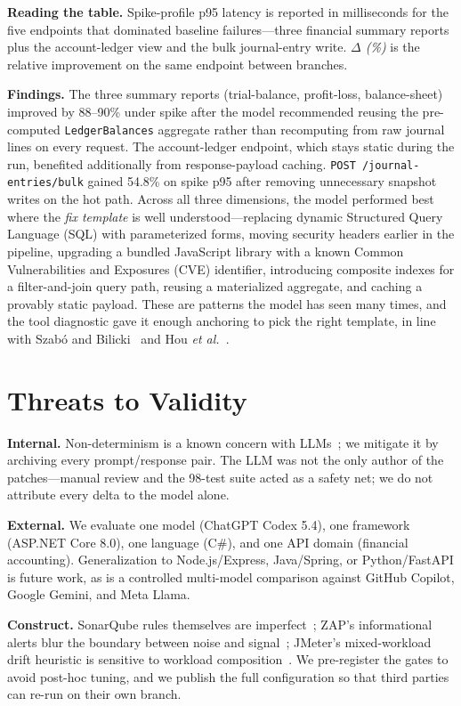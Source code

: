 \documentclass[conference,letterpaper]{IEEEtran}
\begin{document}
\textbf{Reading the table.} Spike-profile p95 latency is reported in milliseconds for the five endpoints that dominated baseline failures---three financial summary reports plus the account-ledger view and the bulk journal-entry write. \emph{$\Delta$ (\%)} is the relative improvement on the same endpoint between branches.

\textbf{Findings.} The three summary reports (trial-balance, profit-loss, balance-sheet) improved by 88--90\% under spike after the model recommended reusing the pre-computed \texttt{LedgerBalances} aggregate rather than recomputing from raw journal lines on every request. The account-ledger endpoint, which stays static during the run, benefited additionally from response-payload caching. \texttt{POST /journal-entries/bulk} gained 54.8\% on spike p95 after removing unnecessary snapshot writes on the hot path. Across all three dimensions, the model performed best where the \emph{fix template} is well understood---replacing dynamic Structured Query Language (SQL) with parameterized forms, moving security headers earlier in the pipeline, upgrading a bundled JavaScript library with a known Common Vulnerabilities and Exposures (CVE) identifier, introducing composite indexes for a filter-and-join query path, reusing a materialized aggregate, and caching a provably static payload. These are patterns the model has seen many times, and the tool diagnostic gave it enough anchoring to pick the right template, in line with Szab\'o and Bilicki~\cite{ref7} and Hou \textit{et al.}~\cite{ref14}.

\section{Threats to Validity}
\textbf{Internal.} Non-determinism is a known concern with LLMs~\cite{ref13}; we mitigate it by archiving every prompt/response pair. The LLM was not the only author of the patches---manual review and the 98-test suite acted as a safety net; we do not attribute every delta to the model alone.

\textbf{External.} We evaluate one model (ChatGPT Codex 5.4), one framework (ASP.NET Core 8.0), one language (C\#), and one API domain (financial accounting). Generalization to Node.js/Express, Java/Spring, or Python/FastAPI is future work, as is a controlled multi-model comparison against GitHub Copilot, Google Gemini, and Meta Llama.

\textbf{Construct.} SonarQube rules themselves are imperfect~\cite{ref15}; ZAP's informational alerts blur the boundary between noise and signal~\cite{ref18,ref19}; JMeter's mixed-workload drift heuristic is sensitive to workload composition~\cite{ref20}. We pre-register the gates to avoid post-hoc tuning, and we publish the full configuration so that third parties can re-run on their own branch.
\end{document}
